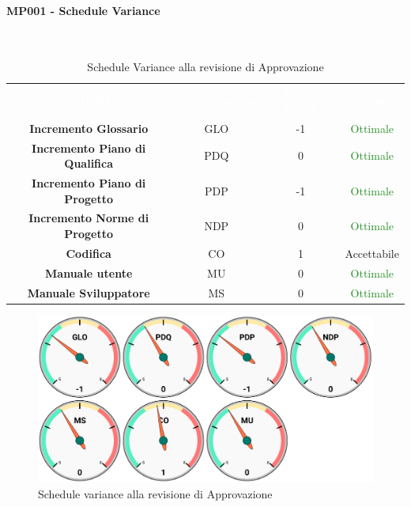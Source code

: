 \paragraph{MP001 - Schedule Variance}\mbox{}\\[0,3cm]

    \begin{table}[H]
        \centering
        \begin{tabular}{cccc}
            \rowcolor{greySWEight}
            \textcolor{white}{\textbf{Attività}} & 
            \textcolor{white}{\textbf{Abbreviazione}} &
            \textcolor{white}{\textbf{Valore Indice}}&
            \textcolor{white}{\textbf{Riscontro}}\\
            \textbf{Incremento Glossario} & GLO & -1 & \textcolor{ForestGreen}{Ottimale} \\
            \textbf{Incremento Piano di Qualifica} & PDQ & 0 & \textcolor{ForestGreen}{Ottimale} \\
            \textbf{Incremento Piano di Progetto} & PDP & -1 & \textcolor{ForestGreen}{Ottimale} \\
            \textbf{Incremento Norme di Progetto} & NDP & 0 & \textcolor{ForestGreen}{Ottimale} \\
            \textbf{Codifica} & CO & 1 & \textcolor{YellowOrange}{Accettabile} \\
            \textbf{Manuale utente} & MU & 0 & \textcolor{ForestGreen}{Ottimale} \\
            \textbf{Manuale Sviluppatore} & MS & 0 & \textcolor{ForestGreen}{Ottimale} \\

        \end{tabular}
        \caption{Schedule Variance alla revisione di Approvazione}
    \end{table}
    \begin{figure}[H]
        \centering
        \includegraphics[width=0.9\linewidth]{sez/App_Esito/Approvazione/graph/scheduleVarianceRA.pdf}
        \caption{Schedule variance alla revisione di Approvazione}
    \end{figure}
